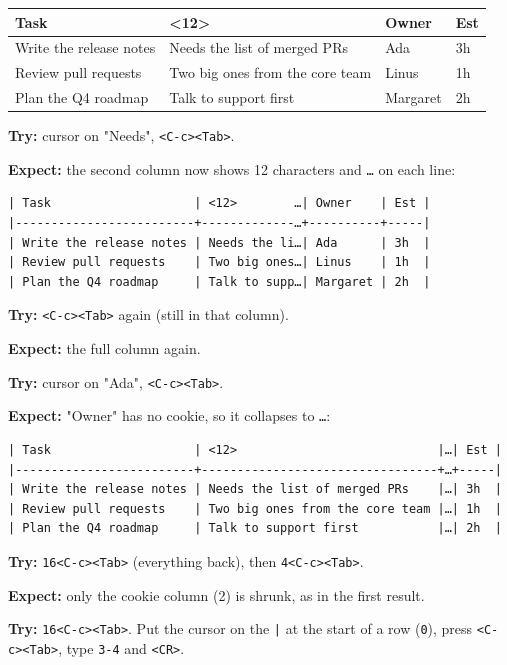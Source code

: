 \begin{table}[htbp]
\label{tab:org19028c7}
\centering
\begin{tabular}{llll}
Task & <12> & Owner & Est\\
\hline
Write the release notes & Needs the list of merged PRs & Ada & 3h\\
Review pull requests & Two big ones from the core team & Linus & 1h\\
Plan the Q4 roadmap & Talk to support first & Margaret & 2h\\
\end{tabular}
\end{table}

\textbf{Try:} cursor on "Needs", \texttt{<C-c><Tab>}.

\textbf{Expect:} the second column now shows 12 characters and \texttt{…} on each line:
\begin{verbatim}
| Task                    | <12>        …| Owner    | Est |
|-------------------------+-------------…+----------+-----|
| Write the release notes | Needs the li…| Ada      | 3h  |
| Review pull requests    | Two big ones…| Linus    | 1h  |
| Plan the Q4 roadmap     | Talk to supp…| Margaret | 2h  |
\end{verbatim}

\textbf{Try:} \texttt{<C-c><Tab>} again (still in that column).

\textbf{Expect:} the full column again.

\textbf{Try:} cursor on "Ada", \texttt{<C-c><Tab>}.

\textbf{Expect:} "Owner" has no cookie, so it collapses to \texttt{…}:
\begin{verbatim}
| Task                    | <12>                            |…| Est |
|-------------------------+---------------------------------+…+-----|
| Write the release notes | Needs the list of merged PRs    |…| 3h  |
| Review pull requests    | Two big ones from the core team |…| 1h  |
| Plan the Q4 roadmap     | Talk to support first           |…| 2h  |
\end{verbatim}

\textbf{Try:} \texttt{16<C-c><Tab>} (everything back), then \texttt{4<C-c><Tab>}.

\textbf{Expect:} only the cookie column (2) is shrunk, as in the first result.

\textbf{Try:} \texttt{16<C-c><Tab>}. Put the cursor on the \texttt{|} at the start of a row
(\texttt{0}), press \texttt{<C-c><Tab>}, type \texttt{3-4} and \texttt{<CR>}.

